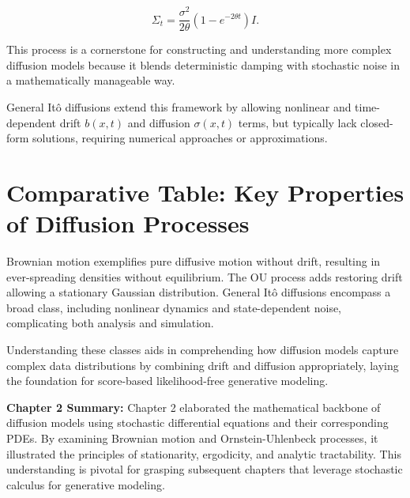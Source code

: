 \documentclass[a4paper,12pt,oneside]{memoir}
\begin{document}
\[
\Sigma_t = \frac{\sigma^2}{2 \theta}(1 - e^{-2\theta t}) I.
\]

This process is a cornerstone for constructing and understanding more complex diffusion models because it blends deterministic damping with stochastic noise in a mathematically manageable way.

General Itô diffusions extend this framework by allowing nonlinear and time-dependent drift \( b(x,t) \) and diffusion \( \sigma(x,t) \) terms, but typically lack closed-form solutions, requiring numerical approaches or approximations.

\section{Comparative Table: Key Properties of Diffusion Processes}

\begin{table}[h]
\centering
{}
\caption{Comparison of classical diffusion processes}
\end{table}

Brownian motion exemplifies pure diffusive motion without drift, resulting in ever-spreading densities without equilibrium. The OU process adds restoring drift allowing a stationary Gaussian distribution. General Itô diffusions encompass a broad class, including nonlinear dynamics and state-dependent noise, complicating both analysis and simulation.

Understanding these classes aids in comprehending how diffusion models capture complex data distributions by combining drift and diffusion appropriately, laying the foundation for score-based likelihood-free generative modeling.

\textbf{Chapter 2 Summary:}  
Chapter 2 elaborated the mathematical backbone of diffusion models using stochastic differential equations and their corresponding PDEs. By examining Brownian motion and Ornstein-Uhlenbeck processes, it illustrated the principles of stationarity, ergodicity, and analytic tractability. This understanding is pivotal for grasping subsequent chapters that leverage stochastic calculus for generative modeling.
\end{document}
